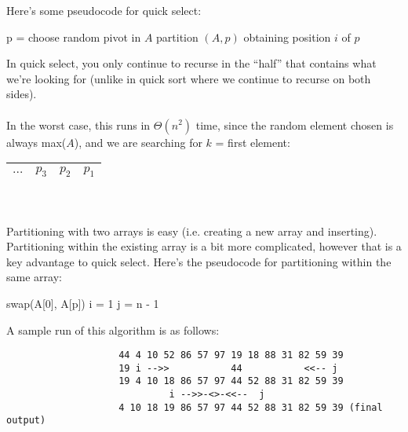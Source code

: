 \documentclass[]{article}
\theoremstyle{definition}
\newcommand{\lecture}[1]{\marginpar{{\footnotesize $\leftarrow$ \underline{#1}}}}
\begin{document}
				Here's some pseudocode for quick select: \\
				\begin{algorithm}[H]
					p = choose random pivot in $A$\;
					partition $(A, p)$ obtaining position $i$ of $p$\;
				\end{algorithm}
				In quick select, you only continue to recurse in the ``half'' that contains what we're looking for (unlike in quick sort where we continue to recurse on both sides).
				\\ \\
				In the worst case, this runs in $\Theta(n^2)$ time, since the random element chosen is always max($A$), and we are searching for $k$ = first element:
				\begin{tabular}{|c|c|c|c|}
					\hline $\ldots$ & $p_3$ & $p_2$ & $p_1$ \\ \hline
				\end{tabular}
				\\ \\
				Partitioning with two arrays is easy (i.e. creating a new array and inserting). Partitioning within the existing array is a bit more complicated, however that is a key advantage to quick select. Here's the pseudocode for partitioning within the same array: \\
				\begin{algorithm}
					swap(A[0], A[p])\;
					i = 1\;
					j = n - 1\;
				\end{algorithm}
				A sample run of this algorithm is as follows:
				\lecture{January 29, 2013} \begin{verbatim}
					44 4 10 52 86 57 97 19 18 88 31 82 59 39
					19 i -->>           44           <<-- j
					19 4 10 18 86 57 97 44 52 88 31 82 59 39
					         i -->>-<>-<<--  j
					4 10 18 19 86 57 97 44 52 88 31 82 59 39 (final output)
				\end{verbatim}
\end{document}
